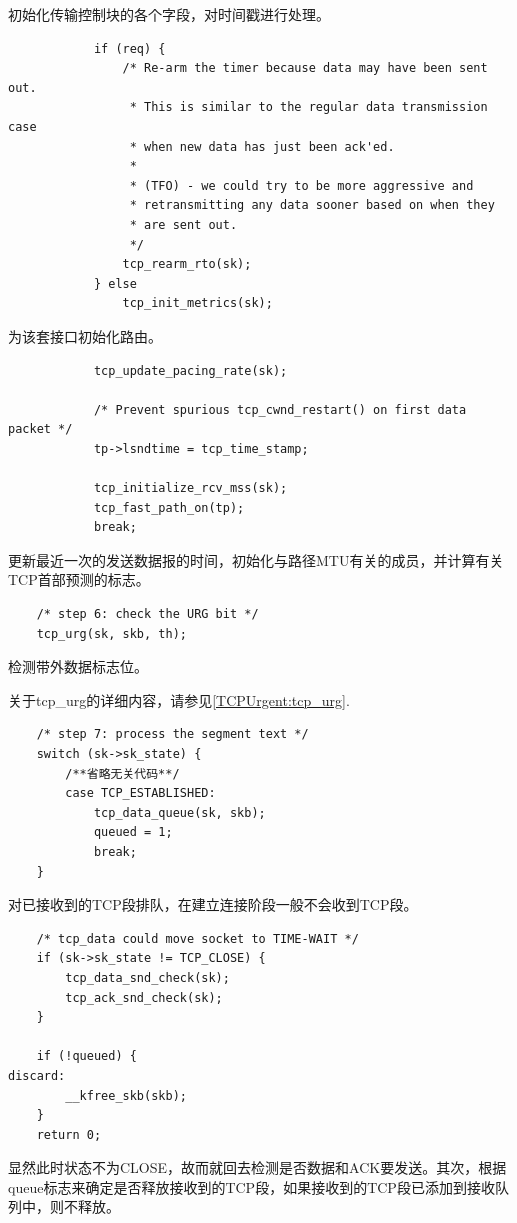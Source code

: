     初始化传输控制块的各个字段，对时间戳进行处理。

\begin{verbatim}
            if (req) {
                /* Re-arm the timer because data may have been sent out.
                 * This is similar to the regular data transmission case
                 * when new data has just been ack'ed.
                 *
                 * (TFO) - we could try to be more aggressive and
                 * retransmitting any data sooner based on when they
                 * are sent out.
                 */
                tcp_rearm_rto(sk);
            } else
                tcp_init_metrics(sk);
\end{verbatim}

    为该套接口初始化路由。

\begin{verbatim}
            tcp_update_pacing_rate(sk);

            /* Prevent spurious tcp_cwnd_restart() on first data packet */
            tp->lsndtime = tcp_time_stamp;

            tcp_initialize_rcv_mss(sk);
            tcp_fast_path_on(tp);
            break;
\end{verbatim}

    更新最近一次的发送数据报的时间，初始化与路径MTU有关的成员，并计算有关TCP首部预测的标志。

\begin{verbatim}
    /* step 6: check the URG bit */
    tcp_urg(sk, skb, th);
\end{verbatim}

    检测带外数据标志位。

    关于tcp\_urg的详细内容，请参见\ref{TCPUrgent:tcp_urg}.

\begin{verbatim}
    /* step 7: process the segment text */
    switch (sk->sk_state) {
        /**省略无关代码**/
        case TCP_ESTABLISHED:
            tcp_data_queue(sk, skb);
            queued = 1;
            break;
    }
\end{verbatim}

                对已接收到的TCP段排队，在建立连接阶段一般不会收到TCP段。

\begin{verbatim}
    /* tcp_data could move socket to TIME-WAIT */
    if (sk->sk_state != TCP_CLOSE) {
        tcp_data_snd_check(sk);
        tcp_ack_snd_check(sk);
    }

    if (!queued) {
discard:
        __kfree_skb(skb);
    }
    return 0;
\end{verbatim}

                显然此时状态不为CLOSE，故而就回去检测是否数据和ACK要发送。其次，根据queue标志来确定是否释放接收到的TCP段，如果接收到的TCP段已添加到接收队列中，则不释放。
